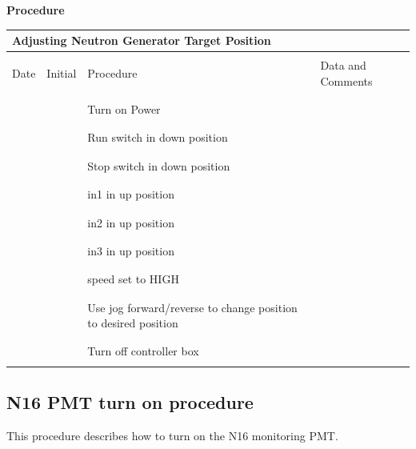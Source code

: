{\bf Procedure}

\begin{center}
\begin{tabular}{|c|c|p{7cm}|l|}
\hline
\multicolumn{4}{|l|}{Adjusting Neutron Generator Target Position}\\
\hline
& & & \\
Date & Initial & Procedure & Data and Comments \\
& & & \\
\hline
& & & \\
& & Turn on Power & \\
& & & \\
\hline
& & & \\
& & Run switch in down position & \\
& & & \\
\hline
& & & \\
& & Stop switch in down position & \\
& & & \\
\hline
& & & \\
& & in1 in up position & \\
& & & \\
\hline
& & & \\
& & in2 in up position & \\
& & & \\
\hline
& & & \\
& & in3 in up position & \\
& & & \\
\hline
& & & \\
& & speed set to HIGH & \\
& & & \\
\hline
& & & \\
& & Use jog forward/reverse to change position to desired position & \\
& & & \\
\hline
& & & \\
& & Turn off controller box & \\
& & & \\
\hline
\end{tabular}
\end{center}

\subsection{ N16 PMT turn on procedure}

This procedure describes how to turn on the N16 monitoring PMT.

